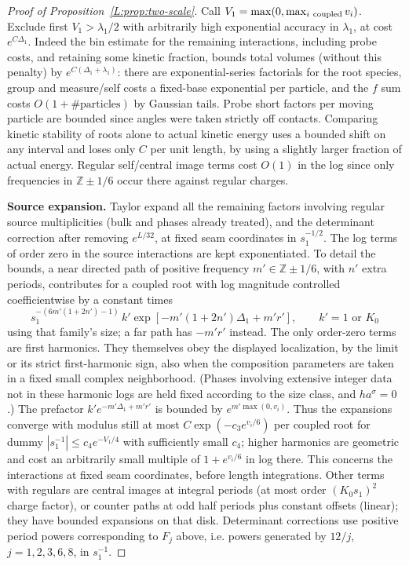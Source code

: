 \documentclass[11pt]{article}
\numberwithin{equation}{section}
\theoremstyle{definition}\newtheorem{definition}[theorem]{Definition}
\theoremstyle{remark}\newtheorem{remark}[theorem]{Remark}
\begin{document}
\begin{proof}[Proof of Proposition~\ref{L:prop:two-scale}]
Call \(V_1=\max(0,\max_{i\ {\rm coupled}}v_i)\). Exclude first \(V_1>\lambda_1/2\) with arbitrarily high exponential accuracy in \(\lambda_1\), at cost \(e^{C\Delta_1}\). Indeed the bin estimate for the remaining interactions, including probe costs, and retaining some kinetic fraction, bounds total volumes (without this penalty) by \(e^{C(\Delta_1+\lambda_1)}\): there are exponential-series factorials for the root species, group and measure/self costs a fixed-base exponential per particle, and the \(f\) sum costs \(O(1+\#\text{particles})\) by Gaussian tails. Probe short factors per moving particle are bounded since angles were taken strictly off contacts. Comparing kinetic stability of roots alone to actual kinetic energy uses a bounded shift on any interval and loses only \(C\) per unit length, by using a slightly larger fraction of actual energy. Regular self/central image terms cost \(O(1)\) in the log since only frequencies in \(\mathbb Z\pm1/6\) occur there against regular charges.

\par\medskip\noindent\textbf{Source expansion.}
Taylor expand all the remaining factors involving regular source multiplicities (bulk and phases already treated), and the determinant correction after removing \(e^{L/32}\), at fixed seam coordinates in \(s_1^{-1/2}\). The log terms of order zero in the source interactions are kept exponentiated. To detail the bounds, a near directed path of positive frequency \(m'\in\mathbb Z\pm1/6\), with \(n'\) extra periods, contributes for a coupled root with log magnitude controlled coefficientwise by a constant times
\[
 s_1^{-(6m'(1+2n')-1)}
 \, k' \exp[-m'(1+2n')\Delta_1+m'r'],\qquad k'=1\text{ or }K_0
\]
using that family's size; a far path has \(-m'r'\) instead. The only order-zero terms are first harmonics. They themselves obey the displayed localization, by the limit or its strict first-harmonic sign, also when the composition parameters are taken in a fixed small complex neighborhood. (Phases involving extensive integer data not in these harmonic logs are held fixed according to the size class, and \(h a^\sigma=0\).) The prefactor \(k'e^{-m'\Delta_1+m'r'}\) is bounded by \(e^{m'\max(0,v_i)}\). Thus the expansions converge with modulus still at most \(C\exp(-c_3 e^{v_i/6})\) per coupled root for dummy \(|s_1^{-1}|\le c_4 e^{-V_1/4}\) with sufficiently small \(c_4\); higher harmonics are geometric and cost an arbitrarily small multiple of \(1+e^{v_i/6}\) in log there. This concerns the interactions at fixed seam coordinates, before length integrations. Other terms with regulars are central images at integral periods (at most order \((K_0s_1)^2\) charge factor), or counter paths at odd half periods plus constant offsets (linear); they have bounded expansions on that disk. Determinant corrections use positive period powers corresponding to \(F_j\) above, i.e. powers generated by \(12/j\), \(j=1,2,3,6,8\), in \(s_1^{-1}\).


\end{proof}
\end{document}
